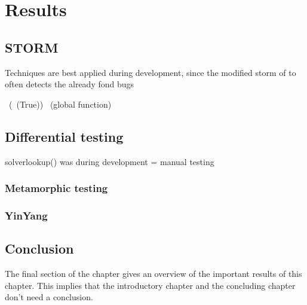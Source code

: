 \chapter{Results}
\label{cha:v}

\section{STORM}
Techniques are best applied during development, since the modified storm of to often detects the already fond bugs

~(~(True))
~(global function)
\section{Differential testing}
solverlookup()  was during development = manual testing

\subsection{Metamorphic testing}
\subsection{YinYang}


\section{Conclusion}
The final section of the chapter gives an overview of the important results
of this chapter. This implies that the introductory chapter and the
concluding chapter don't need a conclusion.

